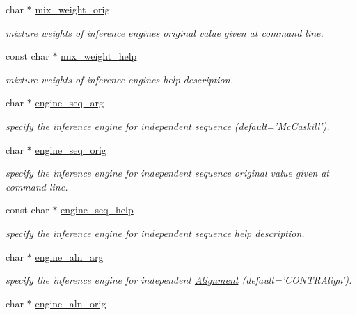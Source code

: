 \begin{DoxyCompactItemize}
char $\ast$ \hyperlink{structgengetopt__args__info_a4c5708197ebf9d7e52ea2a2b7988b5b8}{mix\+\_\+weight\+\_\+orig}
\begin{DoxyCompactList}\small\item\em mixture weights of inference engines original value given at command line. \end{DoxyCompactList}\item 
const char $\ast$ \hyperlink{structgengetopt__args__info_ab851e0e7b97a8147581e5ef2407d000b}{mix\+\_\+weight\+\_\+help}
\begin{DoxyCompactList}\small\item\em mixture weights of inference engines help description. \end{DoxyCompactList}\item 
char $\ast$ \hyperlink{structgengetopt__args__info_a1a3510547af7d7dd9e238d147fb3bbf7}{engine\+\_\+seq\+\_\+arg}
\begin{DoxyCompactList}\small\item\em specify the inference engine for independent sequence (default='Mc\+Caskill'). \end{DoxyCompactList}\item 
char $\ast$ \hyperlink{structgengetopt__args__info_abe98c49189906e22b3050266037b7a60}{engine\+\_\+seq\+\_\+orig}
\begin{DoxyCompactList}\small\item\em specify the inference engine for independent sequence original value given at command line. \end{DoxyCompactList}\item 
const char $\ast$ \hyperlink{structgengetopt__args__info_a49e17a823ee81349a2a9ae841c4efa37}{engine\+\_\+seq\+\_\+help}
\begin{DoxyCompactList}\small\item\em specify the inference engine for independent sequence help description. \end{DoxyCompactList}\item 
char $\ast$ \hyperlink{structgengetopt__args__info_a80b9792246c023eb1ddd04336b226c1a}{engine\+\_\+aln\+\_\+arg}
\begin{DoxyCompactList}\small\item\em specify the inference engine for independent \hyperlink{class_alignment}{Alignment} (default='C\+O\+N\+T\+R\+Align'). \end{DoxyCompactList}\item 
char $\ast$ \hyperlink{structgengetopt__args__info_aefc2d0fce93eea31fcad7240368fc488}{engine\+\_\+aln\+\_\+orig}

\end{DoxyCompactItemize}
